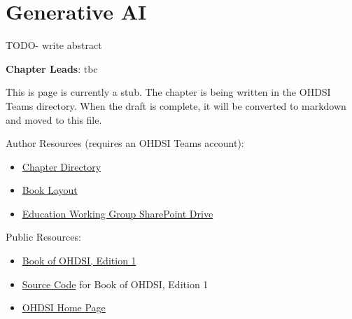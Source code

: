\documentclass[
  letterpaper,
  paper=7in:10in,
  pagesize=pdftex,
  headinclude=on,
  footinclude=on,
  12pt]{scrbook}
\providecommand{\tightlist}{%
  \setlength{\itemsep}{0pt}\setlength{\parskip}{0pt}}\usepackage{longtable,booktabs,array}
\begin{document}
\chapter{Generative AI}\label{sec-action-genai}

TODO- write abstract

\hfill\break

\textbf{Chapter Leads}: tbc

\begin{tcolorbox}[enhanced jigsaw, opacitybacktitle=0.6, coltitle=black, colback=white, bottomrule=.15mm, bottomtitle=1mm, title=\textcolor{quarto-callout-note-color}{\faInfo}\hspace{0.5em}{Note}, titlerule=0mm, rightrule=.15mm, colbacktitle=quarto-callout-note-color!10!white, colframe=quarto-callout-note-color-frame, toptitle=1mm, arc=.35mm, left=2mm, breakable, opacityback=0, leftrule=.75mm, toprule=.15mm]

This is page is currently a stub. The chapter is being written in the
OHDSI Teams directory. When the draft is complete, it will be converted
to markdown and moved to this file.

Author Resources (requires an OHDSI Teams account):

\begin{itemize}
\tightlist
\item
  \href{https://ohdsiorg.sharepoint.com/sites/Workgroup-EducationWorkingGroup/Shared\%20Documents/Forms/AllItems.aspx?id=\%2Fsites\%2FWorkgroup\%2DEducationWorkingGroup\%2FShared\%20Documents\%2FSection\%20VI\%20\%2D\%20Special\%20Therapeutic\%20Areas\%2FChapter\%2024\%20Generative\%20AI&viewid=05fec2cc\%2Dec8a\%2D4d04\%2Db565\%2Dcf1289b96f67}{Chapter
  Directory}
\item
  \href{https://ohdsiorg.sharepoint.com/:x:/r/sites/Workgroup-EducationWorkingGroup/_layouts/15/Doc2.aspx?action=edit&sourcedoc=\%7B1fa31e39-1c5f-4918-b878-609ebd9810b3\%7D&wdOrigin=TEAMS-WEB.teamsSdk_ns.rwc&wdExp=TEAMS-TREATMENT&wdhostclicktime=1748104477731&web=1}{Book
  Layout}
\item
  \href{https://ohdsiorg.sharepoint.com/sites/Workgroup-EducationWorkingGroup/Shared\%20Documents/Forms/AllItems.aspx?viewid=05fec2cc\%2Dec8a\%2D4d04\%2Db565\%2Dcf1289b96f67}{Education
  Working Group SharePoint Drive}
\end{itemize}

Public Resources:

\begin{itemize}
\tightlist
\item
  \href{https://ohdsi.github.io/TheBookOfOhdsi/}{Book of OHDSI, Edition
  1}
\item
  \href{https://github.com/OHDSI/TheBookOfOhdsi}{Source Code} for Book
  of OHDSI, Edition 1
\item
  \href{https://ohdsi.org/}{OHDSI Home Page}
\end{itemize}

\end{tcolorbox}
\end{document}
